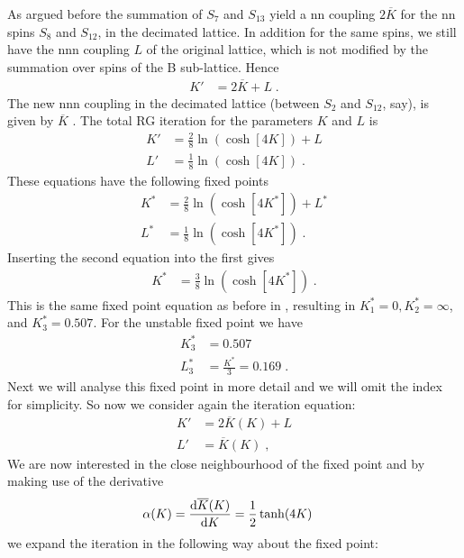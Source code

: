 As argued before the summation of $S_{7}$ and $S_{13}$ yield a nn 
coupling $2 \overline K$ for the nn spins $S_{8}$ and $S_{12}$, in the decimated lattice. In addition for the same spins, we still have the  nnn coupling $L$ of the original 
lattice, which is not modified by the summation over spins of the B sub-lattice.
Hence 
%
\begin{align}
K' &= 2 \overline K + L\;.
\end{align}
%
The  new nnn coupling in the decimated lattice (between $S_{2}$ and $S_{12}$, say),
is given by $\overline K$ 
. The total RG iteration for the parameters $K$ and $L$ is
%
\begin{align}\label{eq:RG:Ising:2D:b}
K' &= \frac{2}{8}\ln(\cosh[4K])    + L\\
L' &= \frac{1}{8}\ln(\cosh[4K])\;.
\end{align}
%
These equations have the following fixed points
\begin{align}\label{eq:RG:Ising:2D}
K^{*} &= \frac{2}{8}\ln(\cosh[4K^{*}])    + L^{*}\\
L^{*} &= \frac{1}{8}\ln(\cosh[4K^{*}])\;.
\end{align}
%
Inserting the second equation into the first gives
%
\begin{align*}
K^{*} &= \frac{3}{8}\ln(\cosh[4K^{*}])\;.
\end{align*}
%
This is the same fixed point equation as before in  , resulting in
$K_{1}^{*}=0, K_{2}^{*}=\infty$, and $K_{3}^{*}=0.507$.
For the unstable fixed point we have
%
\begin{align}
K^{*}_{3} &= 0.507\\
L^{*}_{3} &= \frac{K^{*}}{3} = 0.169\;.
\end{align}
%
Next we will analyse this fixed point in more detail and we will omit
the index for simplicity.
So now we consider again the iteration equation:
%
\begin{align*}
K' &= 2 \overline K(K) + L\\
L' &= \overline K(K) \;,
\end{align*}
%
We are now interested in the close neighbourhood of the fixed point and by making use of the derivative
%
\begin{align}\label{eq:der:ul:K}
\alpha(K) &= \dv{\overline K(K)}{K} =\frac{1}{2} \tanh(4 K)
\end{align}
%
we expand the iteration in the following way about the fixed point:

